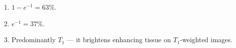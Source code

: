 \begin{enumerate}[leftmargin=1.6em,itemsep=2pt]
\item $1 - e^{-1} = 63\%$.
\item $e^{-1} = 37\%$.
\item Predominantly $T_1$ --- it brightens enhancing tissue on $T_1$-weighted images.
\end{enumerate}
